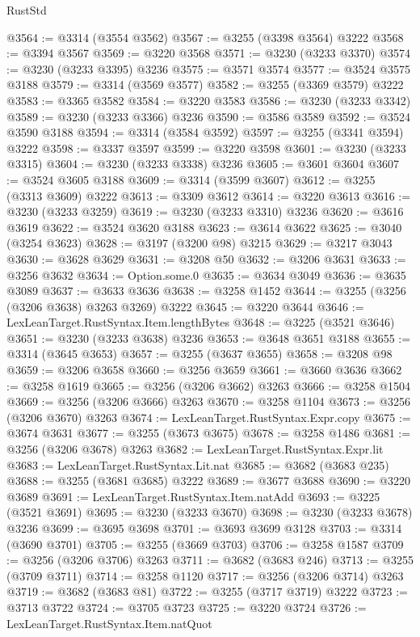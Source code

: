 \begin{lexlean}{RustStd}
\begin{coremodule}
@3564 := @3314 (@3554 @3562)
@3567 := @3255 (@3398 @3564) @3222
@3568 := @3394 @3567
@3569 := @3220 @3568
@3571 := @3230 (@3233 @3370)
@3574 := @3230 (@3233 @3395) @3236
@3575 := @3571 @3574
@3577 := @3524 @3575 @3188
@3579 := @3314 (@3569 @3577)
@3582 := @3255 (@3369 @3579) @3222
@3583 := @3365 @3582
@3584 := @3220 @3583
@3586 := @3230 (@3233 @3342)
@3589 := @3230 (@3233 @3366) @3236
@3590 := @3586 @3589
@3592 := @3524 @3590 @3188
@3594 := @3314 (@3584 @3592)
@3597 := @3255 (@3341 @3594) @3222
@3598 := @3337 @3597
@3599 := @3220 @3598
@3601 := @3230 (@3233 @3315)
@3604 := @3230 (@3233 @3338) @3236
@3605 := @3601 @3604
@3607 := @3524 @3605 @3188
@3609 := @3314 (@3599 @3607)
@3612 := @3255 (@3313 @3609) @3222
@3613 := @3309 @3612
@3614 := @3220 @3613
@3616 := @3230 (@3233 @3259)
@3619 := @3230 (@3233 @3310) @3236
@3620 := @3616 @3619
@3622 := @3524 @3620 @3188
@3623 := @3614 @3622
@3625 := @3040 (@3254 @3623)
@3628 := @3197 (@3200 @98) @3215
@3629 := @3217 @3043
@3630 := @3628 @3629
@3631 := @3208 @50
@3632 := @3206 @3631
@3633 := @3256 @3632
@3634 := Option.some.{0}
@3635 := @3634 @3049
@3636 := @3635 @3089
@3637 := @3633 @3636
@3638 := @3258 @1452
@3644 := @3255 (@3256 (@3206 @3638) @3263 @3269) @3222
@3645 := @3220 @3644
@3646 := LexLeanTarget.RustSyntax.Item.lengthBytes
@3648 := @3225 (@3521 @3646)
@3651 := @3230 (@3233 @3638) @3236
@3653 := @3648 @3651 @3188
@3655 := @3314 (@3645 @3653)
@3657 := @3255 (@3637 @3655)
@3658 := @3208 @98
@3659 := @3206 @3658
@3660 := @3256 @3659
@3661 := @3660 @3636
@3662 := @3258 @1619
@3665 := @3256 (@3206 @3662) @3263
@3666 := @3258 @1504
@3669 := @3256 (@3206 @3666) @3263
@3670 := @3258 @1104
@3673 := @3256 (@3206 @3670) @3263
@3674 := LexLeanTarget.RustSyntax.Expr.copy
@3675 := @3674 @3631
@3677 := @3255 (@3673 @3675)
@3678 := @3258 @1486
@3681 := @3256 (@3206 @3678) @3263
@3682 := LexLeanTarget.RustSyntax.Expr.lit
@3683 := LexLeanTarget.RustSyntax.Lit.nat
@3685 := @3682 (@3683 @235)
@3688 := @3255 (@3681 @3685) @3222
@3689 := @3677 @3688
@3690 := @3220 @3689
@3691 := LexLeanTarget.RustSyntax.Item.natAdd
@3693 := @3225 (@3521 @3691)
@3695 := @3230 (@3233 @3670)
@3698 := @3230 (@3233 @3678) @3236
@3699 := @3695 @3698
@3701 := @3693 @3699 @3128
@3703 := @3314 (@3690 @3701)
@3705 := @3255 (@3669 @3703)
@3706 := @3258 @1587
@3709 := @3256 (@3206 @3706) @3263
@3711 := @3682 (@3683 @246)
@3713 := @3255 (@3709 @3711)
@3714 := @3258 @1120
@3717 := @3256 (@3206 @3714) @3263
@3719 := @3682 (@3683 @81)
@3722 := @3255 (@3717 @3719) @3222
@3723 := @3713 @3722
@3724 := @3705 @3723
@3725 := @3220 @3724
@3726 := LexLeanTarget.RustSyntax.Item.natQuot

\end{coremodule}
\end{lexlean}
